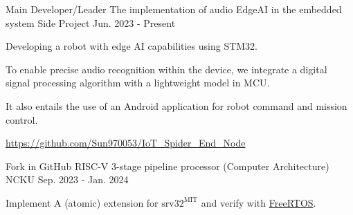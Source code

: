 

\begin{cventries}

  \cventry
    {Main Developer/Leader} %
    {The implementation of audio EdgeAI in the embedded system} %
    {Side Project} %
    {Jun. 2023 - Present} %
    {
      \begin{cvitems} %
        \item {Developing a robot with edge AI capabilities using STM32.}
        \item {To enable precise audio recognition within the device, we integrate a digital signal processing algorithm with a lightweight model in MCU.}
        \item {It also entails the use of an Android application for robot command and mission control.}
        \item {\url{https://github.com/Sun970053/IoT_Spider_End_Node}}
      \end{cvitems}
    }

  \cventry
    {Fork in GitHub} %
    {RISC-V 3-stage pipeline processor (Computer Architecture)} %
    {NCKU} %
    {Sep. 2023 - Jan. 2024} %
    {
      \begin{cvitems} %
        \item {Implement A (atomic) extension for \href{https://github.com/kuopinghsu/srv32}{$\text{srv32}^\text{MIT}$} and verify with \href{https://www.freertos.org/}{FreeRTOS}.}
      \end{cvitems}
    }

\end{cventries}
